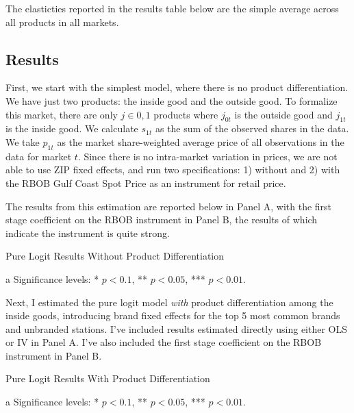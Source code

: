 \documentclass{article}
\begin{document}
The elasticties reported in the results table below are the simple average across all products in all markets.

\subsection{Results}
First, we start with the simplest model, where there is no product differentiation. We have just two products: the inside good and the outside good. To formalize this market, there are only $j \in {0, 1}$ products where $j_{0t}$ is the outside good and $j_{1t}$ is the inside good. We calculate $s_{1t}$ as the sum of the observed shares in the data. We take $p_{1t}$ as the market share-weighted average price of all observations in the data for market $t$. Since there is no intra-market variation in prices, we are not able to use ZIP fixed effects, and run two specifications: 1) without and 2) with the RBOB Gulf Coast Spot Price as an instrument for retail price.

The results from this estimation are reported below in Panel A, with the first stage coefficient on the RBOB instrument in Panel B, the results of which indicate the instrument is quite strong.
\begin{table}[H]
\centering
\caption{Pure Logit Results Without Product Differentiation}
\begin{threeparttable}
		
\begin{tablenotes}
\centering
	\item[a] Significance levels: * $p < 0.1$, ** $p < 0.05$, *** $p < 0.01$.
\end{tablenotes}
\end{threeparttable}
\end{table}

Next, I estimated the pure logit model \textit{with} product differentiation among the inside goods, introducing brand fixed effects for the top 5 most common brands and unbranded stations. I've included results estimated directly using either OLS or IV in Panel A. I've also included the first stage coefficient on the RBOB instrument in Panel B.

\begin{table}[H]
\centering
\caption{Pure Logit Results With Product Differentiation}
\begin{threeparttable}
	
	\begin{tablenotes}
	\centering
		\item[a] Significance levels: * $p < 0.1$, ** $p < 0.05$, *** $p < 0.01$.
	\end{tablenotes}
\end{threeparttable}
\end{table}
\end{document}
